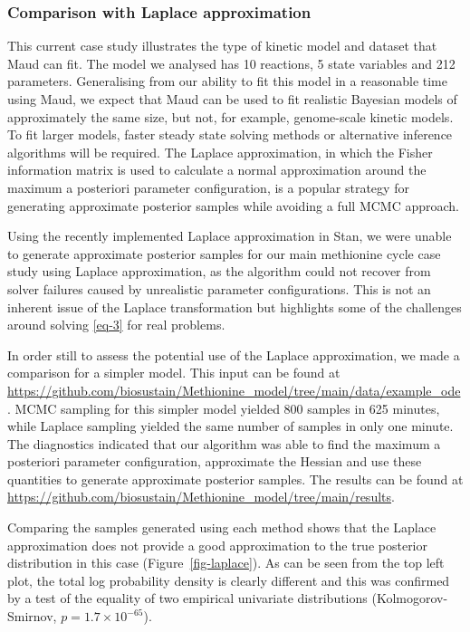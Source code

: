 \documentclass[journal=asbcd6,manuscript=article,layout=traditional]{achemso}
\begin{document}
\subsubsection{Comparison with Laplace approximation}\label{sec-laplace}

This current case study illustrates the type of kinetic model and
dataset that Maud can fit. The model we analysed has 10 reactions, 5
state variables and 212 parameters. Generalising from our ability to fit
this model in a reasonable time using Maud, we expect that Maud can be
used to fit realistic Bayesian models of approximately the same size,
but not, for example, genome-scale kinetic models. To fit larger models,
faster steady state solving methods or alternative inference algorithms
will be required. The Laplace approximation, in which the Fisher
information matrix is used to calculate a normal approximation around
the maximum a posteriori parameter configuration, is a popular strategy
for generating approximate posterior samples while avoiding a full MCMC
approach.

Using the recently implemented Laplace approximation in Stan, we were
unable to generate approximate posterior samples for our main methionine
cycle case study using Laplace approximation, as the algorithm could not
recover from solver failures caused by unrealistic parameter
configurations. This is not an inherent issue of the Laplace
transformation but highlights some of the challenges around solving
\eqref{eq-3} for real problems.

In order still to assess the potential use of the Laplace approximation,
we made a comparison for a simpler model. This input can be found at
\url{https://github.com/biosustain/Methionine_model/tree/main/data/example_ode}.
MCMC sampling for this simpler model yielded 800 samples in 625 minutes,
while Laplace sampling yielded the same number of samples in only one
minute. The diagnostics indicated that our algorithm was able to find
the maximum a posteriori parameter configuration, approximate the
Hessian and use these quantities to generate approximate posterior
samples. The results can be found at
\url{https://github.com/biosustain/Methionine_model/tree/main/results}.

Comparing the samples generated using each method shows that the Laplace
approximation does not provide a good approximation to the true
posterior distribution in this case (Figure~\ref{fig-laplace}). As can
be seen from the top left plot, the total log probability density is
clearly different and this was confirmed by a test of the equality of
two empirical univariate distributions (Kolmogorov-Smirnov,
\(p=1.7\times10^{-65}\)).
\end{document}
